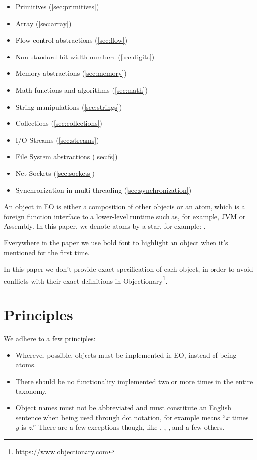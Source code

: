 \documentclass[sigplan,review,11pt,nonacm,natbib=false]{acmart}
\newcommand\aff[1]{\ff{\textcolor{gray}{$\star$}#1}}
\begin{document}
\begin{itemize}
    \item Primitives (\cref{sec:primitives})
    \item Array (\cref{sec:array})
    \item Flow control abstractions (\cref{sec:flow})
    \item Non-standard bit-width numbers (\cref{sec:digits})
    \item Memory abstractions (\cref{sec:memory})
    \item Math functions and algorithms (\cref{sec:math})
    \item String manipulations (\cref{sec:strings})
    \item Collections (\cref{sec:collections})
    \item I/O Streams (\cref{sec:streams})
    \item File System abstractions (\cref{sec:fs})
    \item Net Sockets (\cref{sec:sockets})
    \item Synchronization in multi-threading (\cref{sec:synchronization})
\end{itemize}

An object in EO is either a composition of other objects or an atom, which is a foreign function interface to a lower-level runtime such as, for example, JVM or Assembly. In this paper, we denote atoms by a star, for example: \aff{times}.

Everywhere in the paper we use bold font to highlight an object when it's mentioned for the first time.

In this paper we don't provide exact specification of each object, in order to avoid conflicts with their exact definitions in Objectionary\footnote{\url{https://www.objectionary.com}}.

\section{Principles}

We adhere to a few principles:

\begin{itemize}
    \item Wherever possible, objects must be implemented in EO, instead of being atoms.
    \item There should be no functionality implemented two or more times in the entire taxonomy.
    \item Object names must not be abbreviated and must constitute an English sentence when being used through dot notation,
    for example  means ``$x$ times $y$ is $z$.'' There are a few exceptions though, like , , , and a few others.
\end{itemize}
\end{document}
